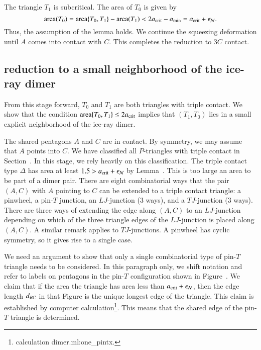 The triangle $T_1$ is subcritical.  The area of $T_0$ is given by
\[
{\operatorname{area}}(T_0) = {\operatorname{area}}\{T_0,T_1\} - {\operatorname{area}}(T_1) 
< 2a_\text{crit} - a_\text{min} = a_\text{crit}+\epsilon_{\mathcal N}.
\]
Thus, the assumption of the lemma holds.  We continue the squeezing
deformation until $A$ comes into contact with $C$.  This completes the
reduction to $3C$ contact.


\subsection{reduction to a small neighborhood of the ice-ray
  dimer}\label{sec:nbd}

From this stage forward, $T_0$ and $T_1$ are both triangles with
triple contact.  We show that the condition ${\operatorname{area}}\{T_0,T_1\}\le
2a_\text{crit}$ implies that $(T_1,T_0)$ lies in a small explicit
neighborhood of the ice-ray dimer.

The shared pentagons $A$ and $C$ are in contact.  By symmetry, we may
assume that $A$ points into $C$.  We have classified all $P$-triangles
with triple contact in Section~.  In this stage, we
rely heavily on this classification.  The triple contact type $\Delta$
has area at least $1.5 > a_\text{crit}+\epsilon_{\mathcal N}$ by Lemma~.
This is too large an area to be part of a dimer pair.  There are eight
combinatorial ways that the pair $(A,C)$ with $A$ pointing to $C$ can
be extended to a triple contact triangle: a pinwheel, a pin-$T$
junction, an $LJ$-junction (3 ways), and a $TJ$-junction (3 ways).
There are three ways of extending the edge along $(A,C)$ to an
$LJ$-junction depending on which of the three triangle edges of the
$LJ$-junction is placed along $(A,C)$.  A similar remark applies to
$TJ$-junctions.  A pinwheel has cyclic symmetry, so it gives rise to a
single case.

We need an argument to show that only a single combinatorial type of
pin-$T$ triangle needs to be considered.  In this paragraph only, we
shift notation and refer to labels on pentagons in the pin-$T$
configuration shown in Figure~.  We claim that if
the area the triangle has area less than $a_\text{crit}+\epsilon_{\mathcal N}$, then the edge
length $d_{BC}$ in that Figure is the unique longest edge of the
triangle.  This claim is established by computer
calculation\footnote{calculation dimer.ml:one\_pintx.}.  This means
that the shared edge of the pin-$T$ triangle is determined.

